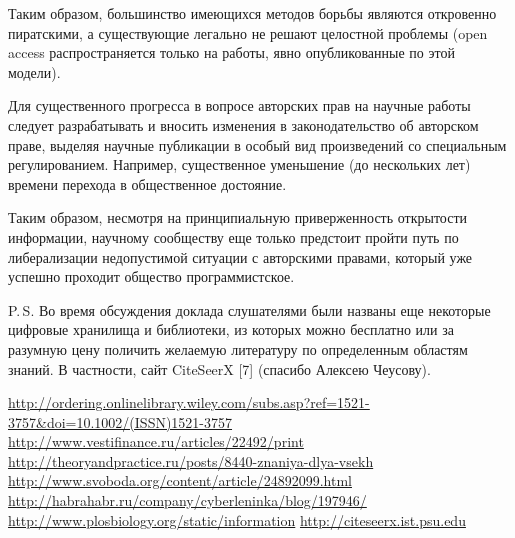 \documentclass [10pt, a5paper]{article}
\begin{document}
Таким образом, большинство имеющихся методов борьбы являются откровенно пиратскими, а существующие легально не решают целостной проблемы (open access распространяется только на работы, явно опубликованные по этой модели).

Для существенного прогресса в вопросе авторских прав на научные работы следует разрабатывать и вносить изменения в законодательство об авторском праве, выделяя научные публикации в особый вид произведений со специальным регулированием. Например, существенное уменьшение (до нескольких лет) времени перехода в общественное достояние.

Таким образом, несмотря на принципиальную приверженность открытости информации, научному сообществу еще только предстоит пройти путь по либерализации недопустимой ситуации с авторскими правами, который уже успешно проходит общество программистское.

P.\,S. Во время обсуждения доклада слушателями были названы еще некоторые цифровые хранилища и библиотеки, из которых можно бесплатно или за разумную цену поличить желаемую литературу по определенным областям знаний. В частности, сайт CiteSeerX [7] (спасибо Алексею Чеусову).

\begin{thebibliography}{9}
  \url{http://ordering.onlinelibrary.wiley.com/subs.asp?ref=1521-3757&doi=10.1002/(ISSN)1521-3757}
  \url{http://www.vestifinance.ru/articles/22492/print}
  \url{http://theoryandpractice.ru/posts/8440-znaniya-dlya-vsekh}
  \url{http://www.svoboda.org/content/article/24892099.html}
  \url{http://habrahabr.ru/company/cyberleninka/blog/197946/}
  \url{http://www.plosbiology.org/static/information}
  \url{http://citeseerx.ist.psu.edu}
\end{thebibliography}
\end{document}
